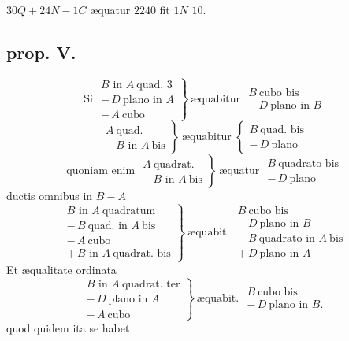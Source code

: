 \documentclass[11pt,a4paper]{article}
\begin{document}
$30Q + 24N - 1C$ æquatur $2240$ fit $1N$ $10$.

\subsection*{prop. V.}

\[ \text{Si } \left.\begin{array}{l} B \text{ in } A\ \text{quad. } 3 \\ -\,D\ \text{plano in } A \\ -\,A\ \text{cubo} \end{array}\right\}\ \text{æquabitur } \begin{array}{l} B\ \text{cubo bis} \\ -\,D\ \text{plano in } B \end{array} \]
\[ \left.\begin{array}{l} A\ \text{quad.} \\ -\,B \text{ in } A\ \text{bis} \end{array}\right\}\ \text{æquabitur } \left\{\begin{array}{l} B\ \text{quad. bis} \\ -\,D\ \text{plano} \end{array}\right. \]
\[ \text{quoniam enim } \left.\begin{array}{l} A\ \text{quadrat.} \\ -\,B \text{ in } A\ \text{bis} \end{array}\right\}\ \text{æquatur } \begin{array}{l} B\ \text{quadrato bis} \\ -\,D\ \text{plano} \end{array} \]
ductis omnibus in $B - A$
\[ \left.\begin{array}{l} B \text{ in } A\ \text{quadratum} \\ -\,B\ \text{quad. in } A\ \text{bis} \\ -\,A\ \text{cubo} \\ +\,B \text{ in } A\ \text{quadrat. bis} \end{array}\right\}\ \text{æquabit. } \begin{array}{l} B\ \text{cubo bis} \\ -\,D\ \text{plano in } B \\ -\,B\ \text{quadrato in } A\ \text{bis} \\ +\,D\ \text{plano in } A \end{array} \]
Et æqualitate ordinata
\[ \left.\begin{array}{l} B \text{ in } A\ \text{quadrat. ter} \\ -\,D\ \text{plano in } A \\ -\,A\ \text{cubo} \end{array}\right\}\ \text{æquabit. } \begin{array}{l} B\ \text{cubo bis} \\ -\,D\ \text{plano in } B. \end{array} \]
quod quidem ita se habet
\end{document}
